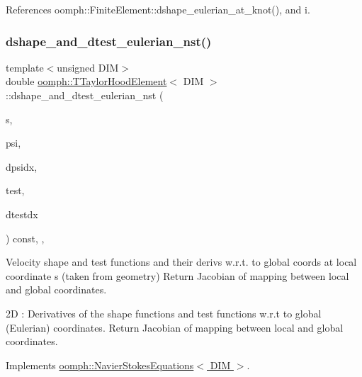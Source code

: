 References oomph\+::\+Finite\+Element\+::dshape\+\_\+eulerian\+\_\+at\+\_\+knot(), and i.

\mbox{\label{classoomph_1_1TTaylorHoodElement_afada2580f5b4f0f94a91c383fe41ac5b}} 
\subsubsection{\texorpdfstring{dshape\+\_\+and\+\_\+dtest\+\_\+eulerian\+\_\+nst()}{dshape\_and\_dtest\_eulerian\_nst()}}
{\footnotesize\ttfamily template$<$unsigned D\+IM$>$ \\
double \hyperlink{classoomph_1_1TTaylorHoodElement}{oomph\+::\+T\+Taylor\+Hood\+Element}$<$ D\+IM $>$\+::dshape\+\_\+and\+\_\+dtest\+\_\+eulerian\+\_\+nst (\begin{DoxyParamCaption}\item[{const \hyperlink{classoomph_1_1Vector}{Vector}$<$ double $>$ \&}]{s,  }\item[{\hyperlink{classoomph_1_1Shape}{Shape} \&}]{psi,  }\item[{\hyperlink{classoomph_1_1DShape}{D\+Shape} \&}]{dpsidx,  }\item[{\hyperlink{classoomph_1_1Shape}{Shape} \&}]{test,  }\item[{\hyperlink{classoomph_1_1DShape}{D\+Shape} \&}]{dtestdx }\end{DoxyParamCaption}) const\hspace{0.3cm}{\ttfamily [inline]}, {\ttfamily [protected]}, {\ttfamily [virtual]}}



Velocity shape and test functions and their derivs w.\+r.\+t. to global coords at local coordinate s (taken from geometry) Return Jacobian of mapping between local and global coordinates. 

2D \+: Derivatives of the shape functions and test functions w.\+r.\+t to global (Eulerian) coordinates. Return Jacobian of mapping between local and global coordinates. 

Implements \hyperlink{classoomph_1_1NavierStokesEquations_aeea4a1a3035ef93deaa68cc869e67dd8}{oomph\+::\+Navier\+Stokes\+Equations$<$ D\+I\+M $>$}.




